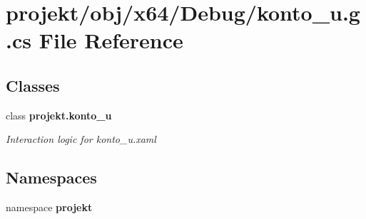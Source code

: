 \section{projekt/obj/x64/\+Debug/konto\+\_\+u.g.\+cs File Reference}
\label{x64_2Debug_2konto__u_8g_8cs}
\subsection*{Classes}
\begin{DoxyCompactItemize}
\item 
class \textbf{ projekt.\+konto\+\_\+u}
\begin{DoxyCompactList}\small\item\em Interaction logic for konto\+\_\+u.\+xaml \end{DoxyCompactList}\end{DoxyCompactItemize}
\subsection*{Namespaces}
\begin{DoxyCompactItemize}
\item 
namespace \textbf{ projekt}
\end{DoxyCompactItemize}

